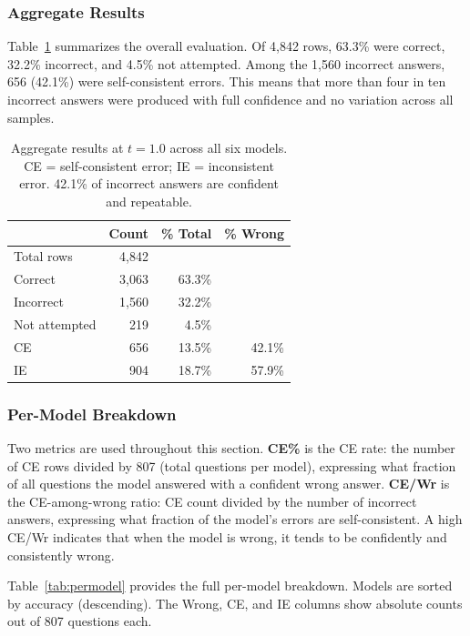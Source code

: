 \documentclass[12pt,twocolumn]{article}
\begin{document}
\subsubsection{Aggregate Results}

Table~\ref{tab:aggregate} summarizes the overall evaluation.
Of 4,842 rows, 63.3\% were correct, 32.2\% incorrect, and 4.5\% not
attempted. Among the 1,560 incorrect answers, 656 (42.1\%) were
self-consistent errors. This means that more than four in ten incorrect
answers were produced with full confidence and no variation across
all samples.

\begin{table}[H]
\centering
\footnotesize
\begin{tabular}{lrrr}
\toprule
 & Count & \% Total & \% Wrong \\
\midrule
Total rows    & 4,842 &        &       \\
Correct       & 3,063 & 63.3\% &       \\
Incorrect     & 1,560 & 32.2\% &       \\
Not attempted &   219 &  4.5\% &       \\
\midrule
CE            &   656 & 13.5\% & 42.1\% \\
IE            &   904 & 18.7\% & 57.9\% \\
\bottomrule
\end{tabular}
\caption{Aggregate results at $t{=}1.0$ across all six models.
CE = self-consistent error; IE = inconsistent error. 42.1\% of
incorrect answers are confident and repeatable.}
\label{tab:aggregate}
\end{table}

\subsubsection{Per-Model Breakdown}

Two metrics are used throughout this section. \textbf{CE\%} is the
CE rate: the number of CE rows divided by 807 (total questions per
model), expressing what fraction of all questions the model answered
with a confident wrong answer. \textbf{CE/Wr} is the CE-among-wrong
ratio: CE count divided by the number of incorrect answers, expressing
what fraction of the model's errors are self-consistent. A high
CE/Wr indicates that when the model is wrong, it tends to be
confidently and consistently wrong.

Table~\ref{tab:permodel} provides the full per-model breakdown. Models
are sorted by accuracy (descending). The Wrong, CE, and IE columns
show absolute counts out of 807 questions each.
\end{document}

